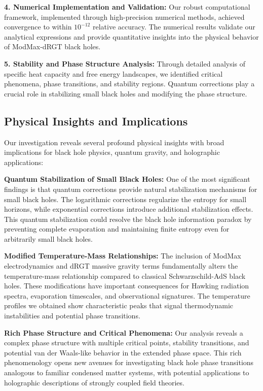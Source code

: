 \documentclass[12pt]{article}
\begin{document}
\textbf{4. Numerical Implementation and Validation:} Our robust computational framework, implemented through high-precision numerical methods, achieved convergence to within $10^{-12}$ relative accuracy. The numerical results validate our analytical expressions and provide quantitative insights into the physical behavior of ModMax-dRGT black holes.

\textbf{5. Stability and Phase Structure Analysis:} Through detailed analysis of specific heat capacity and free energy landscapes, we identified critical phenomena, phase transitions, and stability regions. Quantum corrections play a crucial role in stabilizing small black holes and modifying the phase structure.

\subsection{Physical Insights and Implications}

Our investigation reveals several profound physical insights with broad implications for black hole physics, quantum gravity, and holographic applications:

\textbf{Quantum Stabilization of Small Black Holes:} One of the most significant findings is that quantum corrections provide natural stabilization mechanisms for small black holes. The logarithmic corrections regularize the entropy for small horizons, while exponential corrections introduce additional stabilization effects. This quantum stabilization could resolve the black hole information paradox by preventing complete evaporation and maintaining finite entropy even for arbitrarily small black holes.

\textbf{Modified Temperature-Mass Relationships:} The inclusion of ModMax electrodynamics and dRGT massive gravity terms fundamentally alters the temperature-mass relationship compared to classical Schwarzschild-AdS black holes. These modifications have important consequences for Hawking radiation spectra, evaporation timescales, and observational signatures. The temperature profiles we obtained show characteristic peaks that signal thermodynamic instabilities and potential phase transitions.

\textbf{Rich Phase Structure and Critical Phenomena:} Our analysis reveals a complex phase structure with multiple critical points, stability transitions, and potential van der Waals-like behavior in the extended phase space. This rich phenomenology opens new avenues for investigating black hole phase transitions analogous to familiar condensed matter systems, with potential applications to holographic descriptions of strongly coupled field theories.
\end{document}
